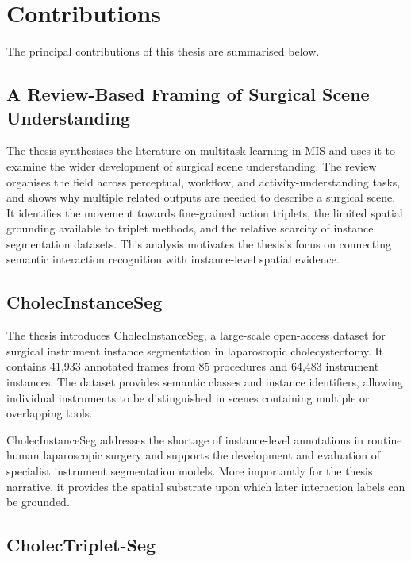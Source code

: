 \section{Contributions}
\label{sec:introduction-contributions}

The principal contributions of this thesis are summarised below.

\subsection{A Review-Based Framing of Surgical Scene Understanding}
\label{sec:introduction-contribution-review}

The thesis synthesises the literature on multitask learning in MIS and uses it to examine the wider development of surgical scene understanding. The review organises the field across perceptual, workflow, and activity-understanding tasks, and shows why multiple related outputs are needed to describe a surgical scene. It identifies the movement towards fine-grained action triplets, the limited spatial grounding available to triplet methods, and the relative scarcity of instance segmentation datasets. This analysis motivates the thesis's focus on connecting semantic interaction recognition with instance-level spatial evidence.

\subsection{CholecInstanceSeg}
\label{sec:introduction-contribution-cholecinstanceseg}

The thesis introduces CholecInstanceSeg, a large-scale open-access dataset for surgical instrument instance segmentation in laparoscopic cholecystectomy. It contains 41,933 annotated frames from 85 procedures and 64,483 instrument instances. The dataset provides semantic classes and instance identifiers, allowing individual instruments to be distinguished in scenes containing multiple or overlapping tools.

CholecInstanceSeg addresses the shortage of instance-level annotations in routine human laparoscopic surgery and supports the development and evaluation of specialist instrument segmentation models. More importantly for the thesis narrative, it provides the spatial substrate upon which later interaction labels can be grounded.

\subsection{CholecTriplet-Seg}
\label{sec:introduction-contribution-cholectripletseg}

